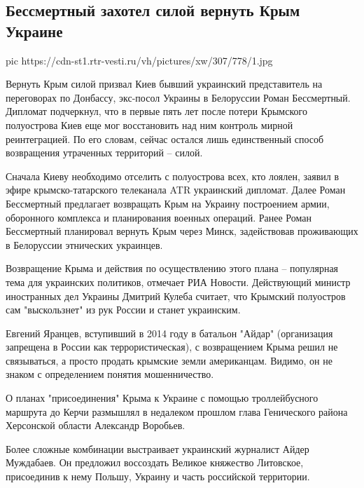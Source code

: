  
 
 
 
 
 
\subsection{Бессмертный захотел силой вернуть Крым Украине}
\label{sec:11_12_2020.news.ru.vesti.2.krym_ukraina_sila}

\ifcmt
pic https://cdn-st1.rtr-vesti.ru/vh/pictures/xw/307/778/1.jpg
\fi

Вернуть Крым силой призвал Киев бывший украинский представитель на переговорах
по Донбассу, экс-посол Украины в Белоруссии Роман Бессмертный. Дипломат
подчеркнул, что в первые пять лет после потери Крымского полуострова Киев еще
мог восстановить над ним контроль мирной реинтеграцией. По его словам, сейчас
остался лишь единственный способ возвращения утраченных территорий – силой.

Сначала Киеву необходимо отселить с полуострова всех, кто лоялен, заявил в
эфире крымско-татарского телеканала ATR украинский дипломат. Далее Роман
Бессмертный предлагает возвращать Крым на Украину построением армии, оборонного
комплекса и планирования военных операций. Ранее Роман Бессмертный планировал
вернуть Крым через Минск, задействовав проживающих в Белоруссии этнических
украинцев.

Возвращение Крыма и действия по осуществлению этого плана – популярная тема для
украинских политиков, отмечает РИА Новости. Действующий министр иностранных дел
Украины Дмитрий Кулеба считает, что Крымский полуостров сам "выскользнет" из
рук России и станет украинским.

Евгений Яранцев, вступивший в 2014 году в батальон "Айдар" (организация
запрещена в России как террористическая), с возвращением Крыма решил не
связываться, а просто продать крымские земли американцам. Видимо, он не знаком
с определением понятия мошенничество.

О планах "присоединения" Крыма к Украине с помощью троллейбусного маршрута до
Керчи размышлял в недалеком прошлом глава Генического района Херсонской области
Александр Воробьев.

Более сложные комбинации выстраивает украинский журналист Айдер Муждабаев. Он
предложил воссоздать Великое княжество Литовское, присоединив к нему Польшу,
Украину и часть российской территории.
